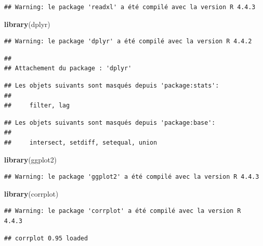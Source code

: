 \documentclass[
]{article}
\newenvironment{Shaded}{\begin{snugshade}}{\end{snugshade}}
\newcommand{\FunctionTok}[1]{\textcolor[rgb]{0.13,0.29,0.53}{\textbf{#1}}}
\newcommand{\NormalTok}[1]{#1}
\begin{document}
\begin{verbatim}
## Warning: le package 'readxl' a été compilé avec la version R 4.4.3
\end{verbatim}

\begin{Shaded}
\begin{Highlighting}[]
\FunctionTok{library}\NormalTok{(dplyr)}
\end{Highlighting}
\end{Shaded}

\begin{verbatim}
## Warning: le package 'dplyr' a été compilé avec la version R 4.4.2
\end{verbatim}

\begin{verbatim}
## 
## Attachement du package : 'dplyr'
\end{verbatim}

\begin{verbatim}
## Les objets suivants sont masqués depuis 'package:stats':
## 
##     filter, lag
\end{verbatim}

\begin{verbatim}
## Les objets suivants sont masqués depuis 'package:base':
## 
##     intersect, setdiff, setequal, union
\end{verbatim}

\begin{Shaded}
\begin{Highlighting}[]
\FunctionTok{library}\NormalTok{(ggplot2)}
\end{Highlighting}
\end{Shaded}

\begin{verbatim}
## Warning: le package 'ggplot2' a été compilé avec la version R 4.4.3
\end{verbatim}

\begin{Shaded}
\begin{Highlighting}[]
\FunctionTok{library}\NormalTok{(corrplot)}
\end{Highlighting}
\end{Shaded}

\begin{verbatim}
## Warning: le package 'corrplot' a été compilé avec la version R 4.4.3
\end{verbatim}

\begin{verbatim}
## corrplot 0.95 loaded
\end{verbatim}
\end{document}
